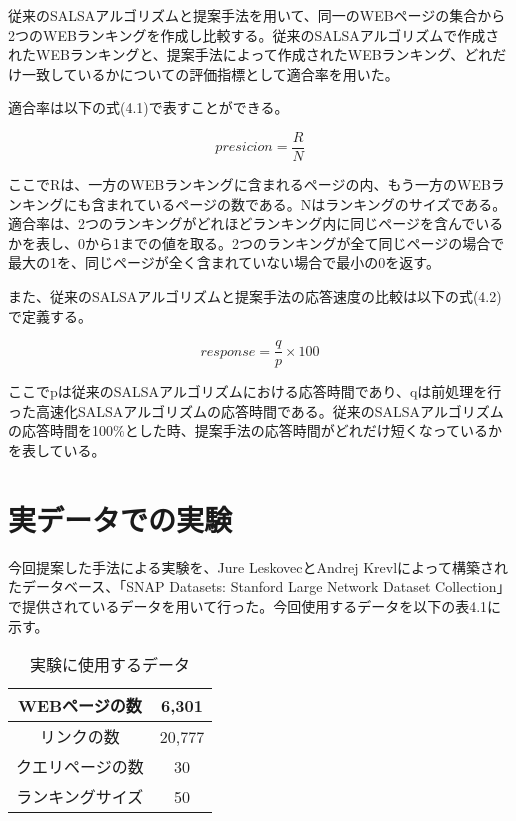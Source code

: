 \documentclass[a4paper,11pt]{jreport}
\begin{document}
従来のSALSAアルゴリズムと提案手法を用いて、同一のWEBページの集合から2つのWEBランキングを作成し比較する。従来のSALSAアルゴリズムで作成されたWEBランキングと、提案手法によって作成されたWEBランキング、どれだけ一致しているかについての評価指標として適合率を用いた。

適合率は以下の式(4.1)で表すことができる。

\begin{equation}
presicion = \frac{R}{N}
\end{equation}

ここでRは、一方のWEBランキングに含まれるページの内、もう一方のWEBランキングにも含まれているページの数である。Nはランキングのサイズである。適合率は、2つのランキングがどれほどランキング内に同じページを含んでいるかを表し、0から1までの値を取る。2つのランキングが全て同じページの場合で最大の1を、同じページが全く含まれていない場合で最小の0を返す。

また、従来のSALSAアルゴリズムと提案手法の応答速度の比較は以下の式(4.2)で定義する。

\begin{equation}
response = \frac{q}{p} \times 100
\end{equation}

ここでpは従来のSALSAアルゴリズムにおける応答時間であり、qは前処理を行った高速化SALSAアルゴリズムの応答時間である。従来のSALSAアルゴリズムの応答時間を100$\%$とした時、提案手法の応答時間がどれだけ短くなっているかを表している。

\section{実データでの実験}

今回提案した手法による実験を、Jure LeskovecとAndrej Krevlによって構築されたデータベース、「SNAP Datasets: Stanford Large Network Dataset Collection」で提供されているデータを用いて行った。今回使用するデータを以下の表4.1に示す。

\begin{table}[htb]
\begin{center}
\caption{実験に使用するデータ}
\begin{tabular}{|c|c|} \hline
    WEBページの数 & 6,301 \\ \hline
    リンクの数 & 20,777 \\  \hline
    クエリページの数 & 30 \\ \hline
    ランキングサイズ & 50\\ \hline
\end{tabular}
\end{center}
\end{table}
\end{document}
